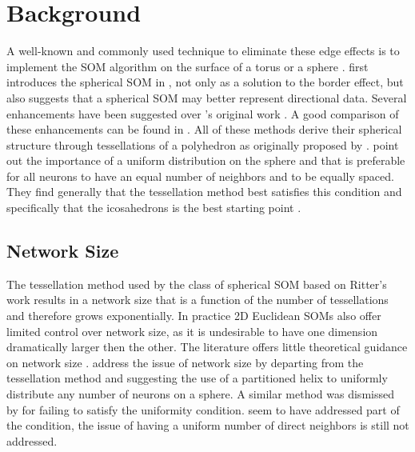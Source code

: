 \documentclass[12pt]{article}
\begin{document}
\section{Background}

A well-known and commonly used technique to eliminate these edge effects is to
implement the SOM algorithm on the surface of a torus or a sphere \citep{ritter99}.
\citeauthor{ritter99} first introduces the spherical SOM in
\citeyear{ritter99}, not only as a solution to the border effect, but also
suggests that a spherical SOM may better represent directional data. Several
enhancements have been suggested over \citeauthor{ritter99}'s original work
\citep{Wu:2006lr,Sangole:2003lr,Nishio:2006fk,boudjemai2003}.  A good
comparison of these enhancements can be found in \citep{Wu:2006lr}.  All of
these methods derive their spherical structure through tessellations of a
polyhedron as originally proposed by \citeauthor{ritter99}.  \cite{Wu:2006lr}
point out the importance of a uniform distribution on the sphere and that is
preferable for all neurons to have an equal number of neighbors and to be
equally spaced.  They find generally that the tessellation method best
satisfies this condition and specifically that the icosahedrons is the best
starting point \citep{wu2005}.

\subsection{Network Size}
The tessellation method used by the class of spherical SOM based on Ritter's
work results in a network size that is a function of the number of
tessellations and therefore grows exponentially. In practice 2D Euclidean SOMs
also offer limited control over network size, as it is undesirable to have one
dimension dramatically larger then the other.  The literature offers little
theoretical guidance on network size \citep{cho1996}.  \cite{Nishio:2006fk}
address the issue of network size by departing from the tessellation method
and suggesting the use of a partitioned helix to uniformly distribute any
number of neurons on a sphere.  A similar method was dismissed by
\cite{wu2005} for failing to satisfy the uniformity condition.
\citeauthor{Nishio:2006fk} seem to have addressed part of the condition, the
issue of having a uniform number of direct neighbors is still not addressed.
\end{document}
